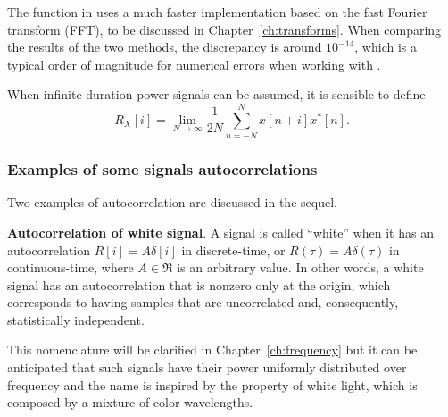 
The function  in {\matlab} uses a much faster implementation based on the fast Fourier transform (FFT), to be discussed in Chapter~\ref{ch:transforms}. When comparing the results of the two methods, the discrepancy is around $10^{-14}$, which is a typical order of magnitude for numerical errors when working with {\matlab}.
\eExample 

When infinite duration power signals can be assumed, it is sensible to define
\begin{equation}
R_X[i] = \lim_{N \rightarrow \infty} \frac 1 {2 N} \sum_{n= -N}^N x[n+i] x^*[n].
\label{eq:discrete_time_power_acf}
\end{equation}

\subsubsection{Examples of some signals autocorrelations}
\label{sec:examplesAutocorrelation}
Two examples of autocorrelation are discussed in the sequel.

\bExample \textbf{Autocorrelation of white signal}.
\label{ex:autocorrelationWhite}
A signal is called ``white'' when it has an autocorrelation $R[i] = A \delta[i]$ in discrete-time, or $R(\tau) = A \delta(\tau)$ in continuous-time, where $A \in \Re$ is an arbitrary value. In other words, a white signal has an autocorrelation that is nonzero only at the origin, which corresponds to having samples that are uncorrelated and, consequently, statistically independent.

This nomenclature will be clarified in Chapter~\ref{ch:frequency} but it can be anticipated that such signals have their power uniformly distributed over frequency and the name is inspired by the property of white light, which is composed by a mixture of color wavelengths.

